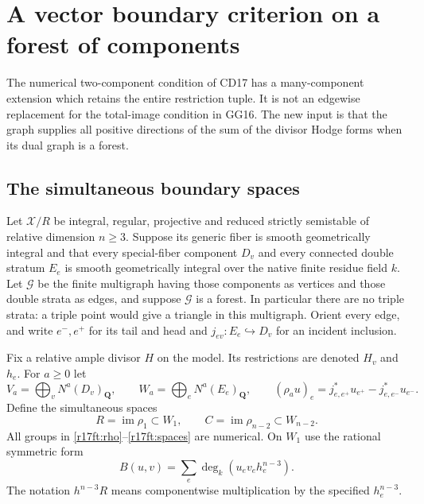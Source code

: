 \section{A vector boundary criterion on a forest of components}
\label{r17ft:section}

The numerical two-component condition of CD17 has a many-component
extension which retains the entire restriction tuple.  It is not
an edgewise replacement for the total-image condition in GG16.
The new input is that the graph supplies all positive directions
of the sum of the divisor Hodge forms when its dual graph is a
forest.

\subsection{The simultaneous boundary spaces}

Let $\mathcal X/R$ be integral, regular, projective and reduced
strictly semistable of relative dimension $n\geq3$.  Suppose its
generic fiber is smooth geometrically integral and that every
special-fiber component $D_v$ and every connected double stratum
$E_e$ is smooth geometrically integral over the native finite
residue field $k$.  Let $\mathcal G$ be the finite multigraph
having those components as vertices and those double strata as
edges, and suppose $\mathcal G$ is a forest.  In particular there
are no triple strata: a triple point would give a triangle in
this multigraph.  Orient every edge, and write $e^-,e^+$ for
its tail and head and $j_{ev}:E_e\hookrightarrow D_v$ for an
incident inclusion.

Fix a relative ample divisor $H$ on the model.  Its restrictions
are denoted $H_v$ and $h_e$.  For $a\geq0$ let
\[
 V_a=\bigoplus_vN^a(D_v)_{\mathbf Q},\qquad
 W_a=\bigoplus_eN^a(E_e)_{\mathbf Q},\qquad
 (\rho_a u)_e=j_{e,e^+}^*u_{e^+}-j_{e,e^-}^*u_{e^-}.
 \tag{FT17.1}\label{r17ft:rho}
\]
Define the simultaneous spaces
\[
                 R=\operatorname{im}\rho_1\subset W_1,
       \qquad C=\operatorname{im}\rho_{n-2}\subset W_{n-2}.
 \tag{FT17.2}\label{r17ft:spaces}
\]
All groups in \eqref{r17ft:rho}--\eqref{r17ft:spaces} are
numerical.  On $W_1$ use the rational symmetric form
\[
       B(u,v)=\sum_e\deg_k(u_ev_eh_e^{n-3}).
 \tag{FT17.3}\label{r17ft:form}
\]
The notation $h^{n-3}R$ means componentwise multiplication by
the specified $h_e^{n-3}$.

